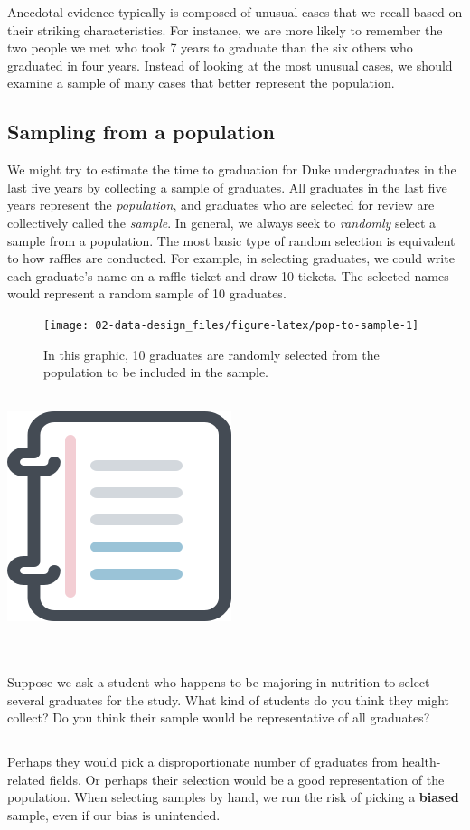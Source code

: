 \documentclass[
  10pt,
  openany]{book}
\newenvironment{mdframedwithfootGPWE}
{   
    \savenotes
    \begin{mdframed}[%
    topline=true, bottomline=true, linecolor=oiB, linewidth=0.5pt,
    rightline=false, leftline=false,
    backgroundcolor=oiLGray]
    \renewcommand{\thempfootnote}{\arabic{footnote}}
    }
{
    \end{mdframed}
    \spewnotes
}
\newenvironment{workedexample}{
    \let\oldrule\rule
    \renewcommand{\rule}[2]{\vspace{-2mm}\oldrule{##1}{##2}\vspace{-2mm}}
\vspace{4mm}
\begin{mdframedwithfootGPWE}
\begin{minipage}[t]{0.10\textwidth}
{$\:$ \\ \setkeys{Gin}{width=2.5em,keepaspectratio}\includegraphics{images/_icons/worked-example.png}}
\end{minipage}
\hfill
\begin{minipage}[t]{0.90\textwidth}
\vspace{-2mm}
\setlength{\parskip}{1em}
\noindent\textbf{\color{oiB}\small\fontfamily{phv}\selectfont{\MakeUppercase{Example}}} $\:$ \\ \\
}{\end{minipage}
\end{mdframedwithfootGPWE}
\vspace{4mm}
}
\begin{document}
Anecdotal evidence typically is composed of unusual cases that we recall based on their striking characteristics.
For instance, we are more likely to remember the two people we met who took 7 years to graduate than the six others who graduated in four years.
Instead of looking at the most unusual cases, we should examine a sample of many cases that better represent the population.

\hypertarget{sampling-from-a-population}{%
\subsection{Sampling from a population}\label{sampling-from-a-population}}

 

We might try to estimate the time to graduation for Duke undergraduates in the last five years by collecting a sample of graduates.
All graduates in the last five years represent the \emph{population}, and graduates who are selected for review are collectively called the \emph{sample}.
In general, we always seek to \emph{randomly} select a sample from a population.
The most basic type of random selection is equivalent to how raffles are conducted.
For example, in selecting graduates, we could write each graduate's name on a raffle ticket and draw 10 tickets.
The selected names would represent a random sample of 10 graduates.

\begin{figure}[h]

{\centering \texttt{[image: 02-data-design\_files/figure-latex/pop-to-sample-1]} 

}

\caption{In this graphic, 10 graduates are randomly selected from the population to be included in the sample.}\label{fig:pop-to-sample}
\end{figure}

\begin{workedexample}
Suppose we ask a student who happens to be majoring in nutrition to select several graduates for the study.
What kind of students do you think they might collect?
Do you think their sample would be representative of all graduates?

\begin{center}\rule{0.5\linewidth}{0.5pt}\end{center}

Perhaps they would pick a disproportionate number of graduates from health-related fields.
Or perhaps their selection would be a good representation of the population.
When selecting samples by hand, we run the risk of picking a \textbf{biased} sample, even if our bias is unintended.

\end{workedexample}
\end{document}
